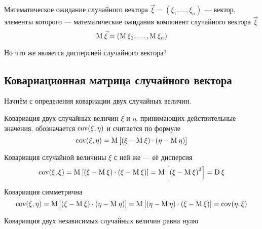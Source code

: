 \begin{definition}
    Математическое ожидание случайного вектора
    $\vec{\xi} = \left( \xi_1, \dots, \xi_n \right)$ --- вектор,
    элементы которого --- математические ожидания компонент
    случайного вектора $\vec{\xi}$
    $$\operatorname{M}_{} \vec{\xi} = \left( \operatorname{M}_{} \xi_1, \dots, \operatorname{M}_{} \xi_n \right)$$
\end{definition}

Но что же является дисперсией случайного вектора?

\subsection{Ковариационная матрица случайного вектора}

Начнём с определения ковариации двух случайных величин.

\begin{definition}[Ковариация]
    Ковариация двух случайных величин $\xi$ и $\eta$, принимающих действительные
    значения, обозначается $\operatorname{cov}\!\left( \xi, \eta \right)$ и считается по формуле
    $$\operatorname{cov}\!\left( \xi, \eta \right)
        = \operatorname{M}_{} \left[ \left( \xi - \operatorname{M}_{} \xi \right)
            \cdot \left( \eta - \operatorname{M}_{} \eta \right) \right]$$
\end{definition}

\begin{remark}
    Ковариация случайной величины $\xi$ с ней же --- её дисперсия
    $$\operatorname{cov}\!\left( \xi, \xi \right)
        = \operatorname{M}_{} \left[ \left( \xi - \operatorname{M}_{} \xi \right)
            \cdot \left( \xi - \operatorname{M}_{} \xi \right) \right]
        = \operatorname{M}_{} \left[ \left( \xi - \operatorname{M}_{} \xi \right)^2 \right]
        = \operatorname{D}_{} \xi$$
\end{remark}

\begin{remark}
    Ковариация симметрична
    $$\operatorname{cov}\!\left( \xi, \eta \right)
        = \operatorname{M}_{} \left[ \left( \xi - \operatorname{M}_{} \xi \right)
            \cdot \left( \eta - \operatorname{M}_{} \eta \right) \right]
        = \operatorname{M}_{} \left[ \left( \eta - \operatorname{M}_{} \eta \right)
            \cdot \left( \xi - \operatorname{M}_{} \xi \right) \right]
        =\operatorname{cov}\!\left( \eta, \xi \right)$$
\end{remark}

\begin{remark}\label{rem:covIndepentent}
    Ковариация двух независимых случайных величин равна нулю
    \cite[с.~244]{Feller1}
\end{remark}

